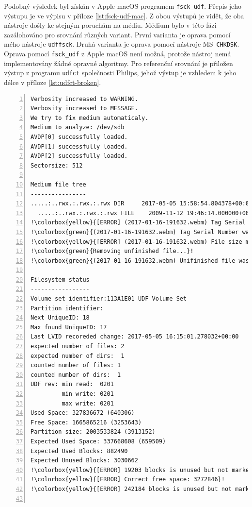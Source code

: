 Podobný výsledek byl získán v Apple macOS programem \texttt{fsck\_udf}. Přepis jeho výstupu je ve výpisu v příloze \ref{lst:fsck-udf-mac}. Z obou výstupů je vidět, že oba nástroje došly ke stejným poruchám na médiu.
Médium bylo v této fázi zazálohováno pro srovnání různých variant. První varianta je oprava pomocí mého nástroje \texttt{udffsck}. Druhá varianta je oprava pomocí nástroje MS~\texttt{CHKDSK}. Oprava pomocí \texttt{fsck\_udf} z Apple macOS není možná, protože nástroj nemá implementovány žádné opravné algoritmy. Pro referenční srovnání je přiložen výstup z programu \texttt{udfct} společnosti Philips, jehož výstup je vzhledem k jeho délce v příloze \ref{lst:udfct-broken}.

\begin{lstlisting}[frame=single,caption={Výsledek opravy poškozeného média programem \texttt{udffsck}},label=lst:udffsck-pass,basicstyle=\ttfamily\scriptsize, keywordstyle=\color{black}\bfseries\underbar,nolol,numbers=left,texcl=false,escapechar=!]
Verbosity increased to WARNING.
Verbosity increased to MESSAGE.
We try to fix medium automaticaly.
Medium to analyze: /dev/sdb
AVDP[0] successfully loaded.
AVDP[1] successfully loaded.
AVDP[2] successfully loaded.
Sectorsize: 512

Medium file tree
----------------
.....:..rwx.:.rwx.:.rwx DIR     2017-05-05 15:58:54.804378+00:00       152  <ROOT>
  .....:..rwx.:.rwx.:.rwx FILE    2009-11-12 19:46:14.000000+00:00  327345425  "gtd.mp4"
!\colorbox{yellow}{[ERROR] (2017-01-16-191632.webm) Tag Serial Number differs.}!
!\colorbox{green}{(2017-01-16-191632.webm) Tag Serial Number was fixed.}!
!\colorbox{yellow}{[ERROR] (2017-01-16-191632.webm) File size mismatch. Probably unfinished file write.}!
!\colorbox{green}{Removing unfinished file...}!
!\colorbox{green}{(2017-01-16-191632.webm) Unifinished file was removed.}!

Filesystem status
-----------------
Volume set identifier:113A1E01 UDF Volume Set
Partition identifier:
Next UniqueID: 18
Max found UniqueID: 17
Last LVID recoreded change: 2017-05-05 16:15:01.278032+00:00
expected number of files: 2
expected number of dirs:  1
counted number of files: 1
counted number of dirs:  1
UDF rev: min read:  0201
         min write: 0201
         max write: 0201
Used Space: 327836672 (640306)
Free Space: 1665865216 (3253643)
Partition size: 2003533824 (3913152)
Expected Used Space: 337668608 (659509)
Expected Used Blocks: 882490
Expected Unused Blocks: 3030662
!\colorbox{yellow}{[ERROR] 19203 blocks is unused but not marked as unallocated in Free Space Table.}!
!\colorbox{yellow}{[ERROR] Correct free space: 3272846}!
!\colorbox{yellow}{[ERROR] 242184 blocks is unused but not marked as unallocated in SBD.}!


\end{lstlisting}
